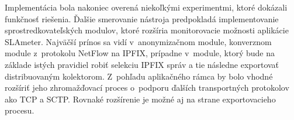 Implementácia bola nakoniec overená niekoľkými experimentmi, ktoré dokázali funkčnosť riešenia. Ďalšie 
smerovanie nástroja predpokladá implementovanie sprostredkovateľských modulov, ktoré rozšíria monitorovacie 
možnosti aplikácie SLAmeter. Najväčší prínos sa vidí v~anonymizačnom module, konverznom module z~protokolu 
NetFlow na IPFIX, prípadne v~module, ktorý
bude na základe istých pravidiel robiť selekciu IPFIX správ a tie následne exportovať distribuovaným 
kolektorom. Z~pohľadu aplikačného rámca by bolo vhodné rozšíriť jeho zhromažďovací proces o~podporu 
ďalších transportných protokolov ako TCP a SCTP. Rovnaké rozšírenie je možné aj na strane exportovacieho 
procesu.


